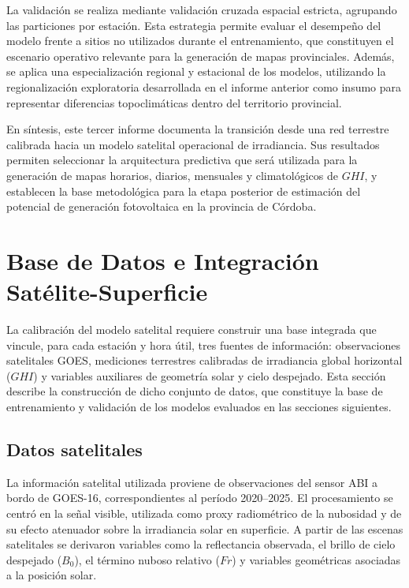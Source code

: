 \documentclass[../main.tex]{subfiles}
\begin{document}
La validación se realiza mediante validación cruzada espacial estricta, agrupando las particiones por estación. Esta estrategia permite evaluar el desempeño del modelo frente a sitios no utilizados durante el entrenamiento, que constituyen el escenario operativo relevante para la generación de mapas provinciales. Además, se aplica una especialización regional y estacional de los modelos, utilizando la regionalización exploratoria desarrollada en el informe anterior como insumo para representar diferencias topoclimáticas dentro del territorio provincial.

En síntesis, este tercer informe documenta la transición desde una red terrestre calibrada hacia un modelo satelital operacional de irradiancia. Sus resultados permiten seleccionar la arquitectura predictiva que será utilizada para la generación de mapas horarios, diarios, mensuales y climatológicos de $GHI$, y establecen la base metodológica para la etapa posterior de estimación del potencial de generación fotovoltaica en la provincia de Córdoba.


\newpage

\section{Base de Datos e Integración Satélite-Superficie}

La calibración del modelo satelital requiere construir una base integrada que vincule, para cada estación y hora útil, tres fuentes de información: observaciones satelitales GOES, mediciones terrestres calibradas de irradiancia global horizontal ($GHI$) y variables auxiliares de geometría solar y cielo despejado. Esta sección describe la construcción de dicho conjunto de datos, que constituye la base de entrenamiento y validación de los modelos evaluados en las secciones siguientes.

\subsection{Datos satelitales}

La información satelital utilizada proviene de observaciones del sensor ABI a bordo de GOES-16, correspondientes al período 2020--2025. El procesamiento se centró en la señal visible, utilizada como proxy radiométrico de la nubosidad y de su efecto atenuador sobre la irradiancia solar en superficie. A partir de las escenas satelitales se derivaron variables como la reflectancia observada, el brillo de cielo despejado ($B_0$), el término nuboso relativo ($Fr$) y variables geométricas asociadas a la posición solar.
\end{document}
